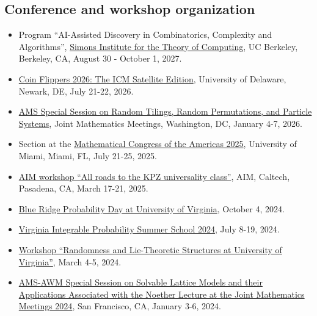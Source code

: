 \documentclass[letterpaper,11pt]{article}
\begin{document}
\subsection*{Conference and workshop organization}

\begin{itemize}
	\item [2027:]
	Program ``AI-Assisted Discovery in Combinatorics, Complexity and Algorithms'',
	\href{https://simons.berkeley.edu/}{Simons Institute for the Theory of Computing}, UC Berkeley,
	Berkeley, CA,
	August 30 - October 1, 2027.

	\item [2026:]
	\href{https://www.coinflippers.org/coin-flippers-2026}{Coin Flippers 2026: The ICM Satellite Edition},
	University of Delaware,
	Newark, DE,
	July 21-22, 2026.

	\item [2026:]
	\href{https://jointmathematicsmeetings.org/jmm}{AMS Special Session on Random Tilings, Random Permutations, and Particle Systems},
	Joint Mathematics Meetings,
	Washington, DC,
	January 4-7, 2026.

	\item [2025:]
	Section at the
	\href{https://www.math.miami.edu/mca/}{Mathematical Congress of the Americas 2025},
	University of Miami,
	Miami, FL,
	July 21-25, 2025.

	\item [2025:]
	\href{https://aimath.org/pastworkshops/roadtokpz.html}{AIM workshop
	``All roads to the KPZ universality class''},
	AIM, Caltech, Pasadena, CA, March 17-21, 2025.

	\item [2024:]
	\href{https://math.virginia.edu/2024/09/BlueRidgeProb/}{Blue Ridge Probability Day at University of Virginia},
	October 4, 2024.

	\item [2024:]
	\href{https://lpetrov.cc/vipss2024/}{Virginia Integrable Probability Summer School 2024},
	July 8-19, 2024.

	\item [2024:]
	\href{https://math.virginia.edu/random-lie-2024/}{Workshop ``Randomness and Lie-Theoretic Structures at University of Virginia''},
	March 4-5, 2024.

	\item [2024:]
\href{https://www.jointmathematicsmeetings.org/meetings/national/jmm2024/2300_program_ss43.html}{AMS-AWM Special Session on Solvable Lattice Models and their Applications Associated with the Noether Lecture at the Joint Mathematics Meetings 2024},
San Francisco, CA, January 3-6, 2024.


\end{itemize}
\end{document}
